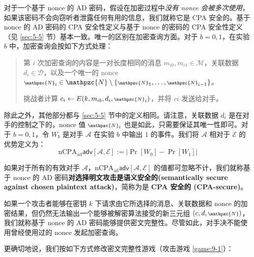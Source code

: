 \begin{snote}
对于一个基于 nonce 的 AD 密码，假设在加密过程中\emph{没有 nonce 会被多次使用}，如果该密码不会向窃听者泄露任何有用的信息，我们就称它是 CPA 安全的。基于 nonce 的 AD 密码的 CPA 安全性定义与基于 nonce 的密码的 CPA 安全性定义（见 \ref{sec:5-5} 节）基本一致。唯一的区别在加密查询方面。对于 $b=0,1$，在实验 $b$ 中，加密查询会按如下方式处理：
\begin{quote}
第 $i$ 次加密查询的内容是一对长度相同的消息 $m_{i0},m_{i1}\in\mathcal{M}$，关联数据 $d_i\in\mathcal{D}$，以及一个唯一的 nonce ${\scriptstyle\mathpzc{N}}_i\in\mathpzc{N}\setminus\{{\scriptstyle\mathpzc{N}}_1,\dots,{\scriptstyle\mathpzc{N}}_{i-1}\}$。

挑战者计算 $c_i\leftarrow E(k,m_{ib},d_i,{\scriptstyle\mathpzc{N}}_i)$，并将 $ci$ 发送给对手。
\end{quote}
除此之外，其他部分都与 \ref{sec:5-5} 节中的定义相同。请注意，关联数据 $d_i$ 是在对手的控制之下的，nonce 值 ${\scriptstyle\mathpzc{N}}_i$ 也是如此，只需要保证其唯一性即可。对于 $b=0,1$，令 $W_b$ 是对手 $\mathcal{A}$ 在实验 $b$ 中输出 $1$ 的事件。我们将 $\mathcal{A}$ 相对于 $\mathcal{E}$ 的优势定义为：
\[
\mathrm{nCPA}_\mathrm{ad}\mathsf{adv}[\mathcal{A},\mathcal{E}]
:=
\big\lvert
\Pr[W_0]-\Pr[W_1]
\big\rvert
\]
\end{snote}

\begin{definition}\label{def:9-7}
如果对于所有的有效对手 $\mathcal{A}$，$\mathrm{nCPA}_\mathrm{ad}\mathsf{adv}[\mathcal{A},\mathcal{E}]$ 的值都可忽略不计，我们就称基于 nonce 的 AD 密码\textbf{对选择明文攻击是语义安全的(semantically secure against chosen plaintext attack)}，简称为是 \textbf{CPA 安全的 (CPA-secure)}。
\end{definition}

\begin{snote}[密文完整性。]
如果一个攻击者能够在密钥 $k$ 下请求由它所选择的消息、关联数据和 nonce 的加密结果，但仍然无法输出一个能够被解密算法接受的新三元组 $(c,d,{\scriptstyle\mathpzc{N}})$，我们就称基于 nonce 的 AD 密码能够提供密文完整性。尽管如此，对手决不能使用曾经使用过的 nonce 发起加密查询。

更确切地说，我们按如下方式修改密文完整性游戏（攻击游戏 \ref{game:9-1}）：
\end{snote}

